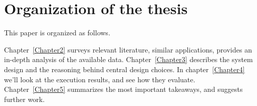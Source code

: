 \section{Organization of the thesis}
\label{sec:thesis_organization}

This paper is organized as follows.

Chapter~\ref{Chapter2} surveys relevant literature, similar applications, provides an in-depth analysis of the available data.
Chapter~\ref{Chapter3} describes the system design and the reasoning behind central design choices.
In chapter~\ref{Chapter4} we'll look at the execution results, and see how they evaluate.
Chapter~\ref{Chapter5} summarizes the most important takeaways, and suggests further work.

